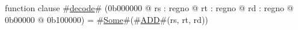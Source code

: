 function clause #\hyperref[zdecode]{decode}# (0b000000 @ rs : regno @ rt : regno @ rd : regno @ 0b00000 @ 0b100000) =
  #\hyperref[zSome]{Some}#(#\hyperref[zADD]{ADD}#(rs, rt, rd))
